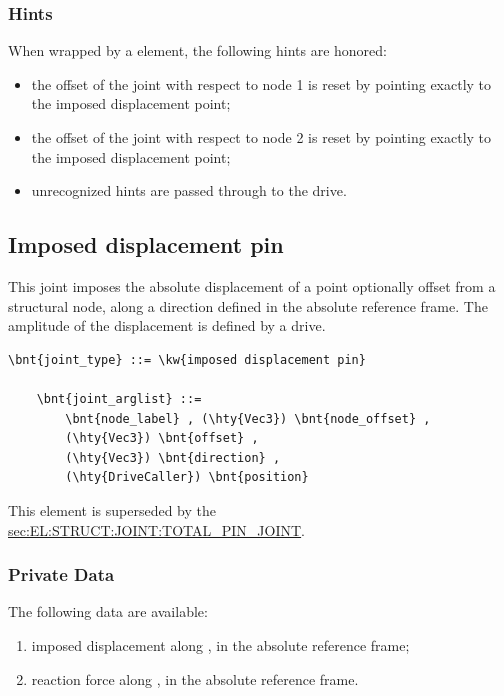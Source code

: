 \subsubsection{Hints}
When wrapped by a  element, the following hints are honored:
\begin{itemize}
\item {} the offset of the joint
with respect to node 1 is reset by pointing exactly
to the imposed displacement point;
\item {} the offset of the joint
with respect to node 2 is reset by pointing exactly
to the imposed displacement point;
\item unrecognized hints are passed through to the drive.
\end{itemize}



\subsection{Imposed displacement pin}
\label{sec:EL:JOINT:IMPOSEDDISPLACEMENTPIN}
This joint imposes the absolute displacement of a point optionally offset
from a structural node, along a direction defined
in the absolute reference frame.
The amplitude of the displacement is defined by a drive.
\begin{Verbatim}[commandchars=\\\{\}]
    \bnt{joint_type} ::= \kw{imposed displacement pin}

    \bnt{joint_arglist} ::= 
        \bnt{node_label} , (\hty{Vec3}) \bnt{node_offset} ,
        (\hty{Vec3}) \bnt{offset} ,
        (\hty{Vec3}) \bnt{direction} ,
        (\hty{DriveCaller}) \bnt{position}
\end{Verbatim}
This element is superseded by the
\hyperref{\kw{total pin joint}}{\kw{total pin joint}, see Section~}{}{sec:EL:STRUCT:JOINT:TOTAL_PIN_JOINT}.

\subsubsection{Private Data}
The following data are available:
\begin{enumerate}
\item {} imposed displacement along ,
in the absolute reference frame;
\item {} reaction force along ,
in the absolute reference frame.
\end{enumerate}

